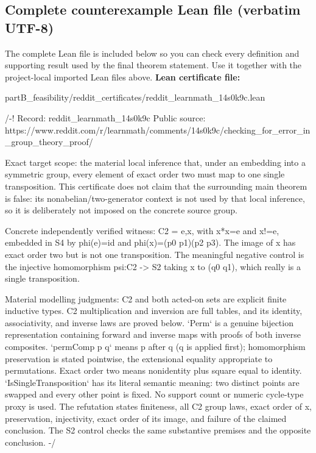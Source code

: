 \documentclass[11pt]{article}
\begin{document}
\subsection*{Complete counterexample Lean file (verbatim UTF-8)}
The complete Lean file is included below so you can check every definition and supporting result used by the final theorem statement. Use it together with the project-local imported Lean files above.
\textbf{Lean certificate file:}
\begin{Vsrc}
partB_feasibility/reddit_certificates/reddit_learnmath_14s0k9c.lean
\end{Vsrc}
\begin{Vlean}
/-!
Record: reddit_learnmath_14s0k9c
Public source: https://www.reddit.com/r/learnmath/comments/14s0k9c/checking_for_error_in_group_theory_proof/

Exact target scope: the material local inference that, under an embedding into
a symmetric group, every element of exact order two must map to one single
transposition.  This certificate does not claim that the surrounding main
theorem is false: its nonabelian/two-generator context is not used by that
local inference, so it is deliberately not imposed on the concrete source
group.

Concrete independently verified witness: C2 = {e,x}, with x*x=e and x!=e,
embedded in S4 by phi(e)=id and phi(x)=(p0 p1)(p2 p3).  The image of x has
exact order two but is not one transposition.  The meaningful negative control
is the injective homomorphism psi:C2 -> S2 taking x to (q0 q1), which really is
a single transposition.

Material modelling judgments: C2 and both acted-on sets are explicit finite
inductive types.  C2 multiplication and inversion are full tables, and its
identity, associativity, and inverse laws are proved below.  `Perm` is a genuine
bijection representation containing forward and inverse maps with proofs of
both inverse composites.  `permComp p q` means p after q (q is applied first);
homomorphism preservation is stated pointwise, the extensional equality
appropriate to permutations.  Exact order two means nonidentity plus square
equal to identity.  `IsSingleTransposition` has its literal semantic meaning:
two distinct points are swapped and every other point is fixed.  No support
count or numeric cycle-type proxy is used.  The refutation states finiteness,
all C2 group laws, exact order of x, preservation, injectivity, exact order of
its image, and failure of the claimed conclusion.  The S2 control checks the
same substantive premises and the opposite conclusion.
-/


\end{Vlean}
\end{document}

